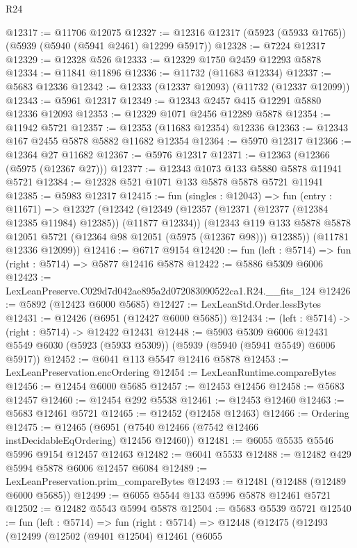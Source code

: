 \begin{lexlean}{R24}
\begin{coremodule}
@12317 := @11706 @12075
@12327 := @12316 @12317 (@5923 (@5933 @1765)) (@5939 (@5940 (@5941 @2461) @12299 @5917))
@12328 := @7224 @12317
@12329 := @12328 @526
@12333 := @12329 @1750 @2459 @12293 @5878
@12334 := @11841 @11896
@12336 := @11732 (@11683 @12334)
@12337 := @5683 @12336
@12342 := @12333 (@12337 @12093) (@11732 (@12337 @12099))
@12343 := @5961 @12317
@12349 := @12343 @2457 @415 @12291 @5880 @12336 @12093
@12353 := @12329 @1071 @2456 @12289 @5878
@12354 := @11942 @5721
@12357 := @12353 (@11683 @12354) @12336
@12363 := @12343 @167 @2455 @5878 @5882 @11682 @12354
@12364 := @5970 @12317
@12366 := @12364 @27 @11682
@12367 := @5976 @12317
@12371 := @12363 (@12366 (@5975 (@12367 @27)))
@12377 := @12343 @1073 @133 @5880 @5878 @11941 @5721
@12384 := @12328 @521 @1071 @133 @5878 @5878 @5721 @11941
@12385 := @5983 @12317
@12415 := fun (singles : @12043) =>
  fun (entry : @11671) =>
  @12327
    (@12342
      (@12349
        (@12357 (@12371 (@12377 (@12384 @12385 @11984) @12385)) (@11877 @12334))
        (@12343 @119 @133 @5878 @5878 @12051 @5721 (@12364 @98 @12051 (@5975 (@12367 @98))) @12385))
      (@11781 @12336 @12099))
@12416 := @6717 @9154
@12420 := fun (left : @5714) => fun (right : @5714) => @5877 @12416 @5878
@12422 := @5886 @5309 @6006
@12423 := LexLeanPreserve.C029d7d042ae895a2d072083090522ca1.R24.__fits_124
@12426 := @5892 (@12423 @6000 @5685)
@12427 := LexLeanStd.Order.lessBytes
@12431 := @12426 (@6951 (@12427 @6000 @5685))
@12434 := (left : @5714) -> (right : @5714) -> @12422 @12431
@12448 := @5903
    @5309
    @6006
    @12431
    @5549
    @6030
    (@5923 (@5933 @5309))
    (@5939 (@5940 (@5941 @5549) @6006 @5917))
@12452 := @6041 @113 @5547 @12416 @5878
@12453 := LexLeanPreservation.encOrdering
@12454 := LexLeanRuntime.compareBytes
@12456 := @12454 @6000 @5685
@12457 := @12453 @12456
@12458 := @5683 @12457
@12460 := @12454 @292 @5538
@12461 := @12453 @12460
@12463 := @5683 @12461 @5721
@12465 := @12452 (@12458 @12463)
@12466 := Ordering
@12475 := @12465 (@6951 (@7540 @12466 (@7542 @12466 instDecidableEqOrdering) @12456 @12460))
@12481 := @6055 @5535 @5546 @5996 @9154 @12457 @12463
@12482 := @6041 @5533
@12488 := @12482 @429 @5994 @5878 @6006 @12457 @6084
@12489 := LexLeanPreservation.prim_compareBytes
@12493 := @12481 (@12488 (@12489 @6000 @5685))
@12499 := @6055 @5544 @133 @5996 @5878 @12461 @5721
@12502 := @12482 @5543 @5994 @5878
@12504 := @5683 @5539 @5721
@12540 := fun (left : @5714) =>
  fun (right : @5714) =>
  @12448
    (@12475
      (@12493
        (@12499
          (@12502
            (@9401 @12504)
            @12461
            (@6055

\end{coremodule}
\end{lexlean}
